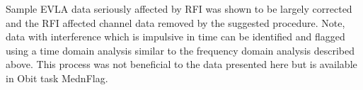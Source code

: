 \documentclass[journal]{IEEEtran}
\begin{document}
Sample EVLA data seriously affected by RFI was shown to be largely
corrected and the RFI affected channel data removed by the suggested
procedure.
Note, data with interference which is impulsive in time can be
identified and flagged using a time domain analysis similar to the
frequency domain analysis described above.
This process was not beneficial to the data presented here but is
available in Obit task MednFlag.

\ifCLASSOPTIONcaptionsoff
  \newpage
\fi





%





\end{document}
